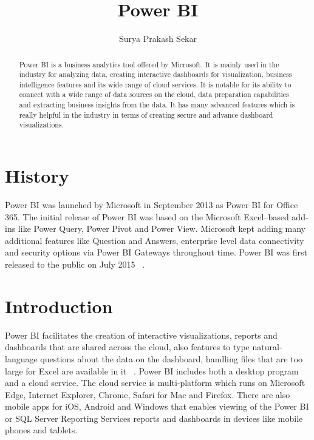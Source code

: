 
\title{Power BI}

\author{Surya Prakash Sekar}

\renewcommand{\shortauthors}{Surya Prakash Sekar}

\begin{abstract}
Power BI is a business analytics tool offered by Microsoft. It is mainly used 
in the industry for analyzing data, creating interactive dashboards for 
visualization, business intelligence features and its wide range of cloud 
services. It is notable for its ability to connect with a wide range of data 
sources on the cloud, data preparation capabilities and extracting business 
insights from the data. It has many advanced features which is really helpful 
in the industry in terms of creating secure and advance dashboard visualizations.
\end{abstract}


\maketitle

\section{History}
Power BI was launched by Microsoft in September 2013 as Power BI for 
Office 365. The initial release of Power BI was based on the Microsoft 
Excel–based add-ins like Power Query, Power Pivot and Power View. Microsoft kept 
adding many additional features like Question and Answers, enterprise level 
data connectivity and security options via Power BI Gateways throughout time. 
Power BI was first released to the public on July 2015
~\cite{hid-sp18-418-powerbi-history}.

\section{Introduction}
Power BI facilitates the creation of interactive visualizations, reports and 
dashboards that are shared across the cloud, also features to type 
natural-language questions about the data on the dashboard, handling files 
that are too large for Excel are available in it
~\cite{hid-sp18-418-powerbi-intro}.
Power BI includes both a desktop program and a cloud service. The cloud service 
is multi-platform which runs on Microsoft Edge, Internet Explorer, Chrome, 
Safari for Mac and Firefox. There are also mobile apps for iOS, Android and 
Windows that enables viewing of the Power BI or SQL Server Reporting Services 
reports and dashboards in devices like mobile phones and tablets.

